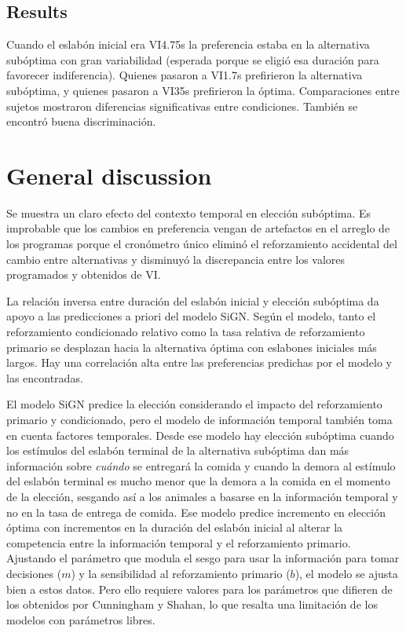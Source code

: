 \documentclass[a4paper,12pt]{article}
\begin{document}
\subsection{Results}

Cuando el eslabón inicial era VI4.75s la preferencia estaba en la alternativa subóptima con gran variabilidad (esperada porque se eligió esa duración para favorecer indiferencia).
Quienes pasaron a VI1.7s prefirieron la alternativa subóptima, y quienes pasaron a VI35s prefirieron la óptima.
Comparaciones entre sujetos mostraron diferencias significativas entre condiciones.
También se encontró buena discriminación.

\section{General discussion}

Se muestra un claro efecto del contexto temporal en elección subóptima.
Es improbable que los cambios en preferencia vengan de artefactos en el arreglo de los programas porque el cronómetro único eliminó el reforzamiento accidental del cambio entre alternativas y disminuyó la discrepancia entre los valores programados y obtenidos de VI.

La relación inversa entre duración del eslabón inicial y elección subóptima da apoyo a las predicciones a priori del modelo SiGN.
Según el modelo, tanto el reforzamiento condicionado relativo como la tasa relativa de reforzamiento primario se desplazan hacia la alternativa óptima con eslabones iniciales más largos.
Hay una correlación alta entre las preferencias predichas por el modelo y las encontradas.

El modelo SiGN predice la elección considerando el impacto del reforzamiento primario y condicionado, pero el modelo de información temporal también toma en cuenta factores temporales.
Desde ese modelo hay elección subóptima cuando los estímulos del eslabón terminal de la alternativa subóptima dan más información sobre {\itshape cuándo} se entregará la comida y cuando la demora al estímulo del eslabón terminal es mucho menor que la demora a la comida en el momento de la elección, sesgando así a los animales a basarse en la información temporal y no en la tasa de entrega de comida.
Ese modelo predice incremento en elección óptima con incrementos en la duración del eslabón inicial al alterar la competencia entre la información temporal y el reforzamiento primario.
Ajustando el parámetro que modula el sesgo para usar la información para tomar decisiones ($m$) y la sensibilidad al reforzamiento primario ($b$), el modelo se ajusta bien a estos datos.
Pero ello requiere valores para los parámetros que difieren de los obtenidos por Cunningham y Shahan, lo que resalta una limitación de los modelos con parámetros libres.
\end{document}
